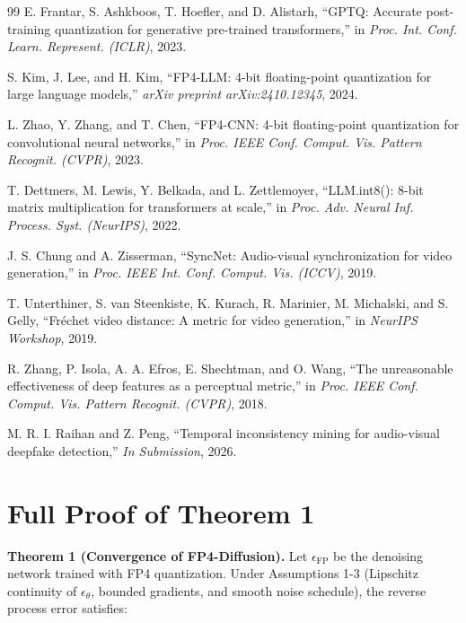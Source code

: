 \documentclass[journal]{IEEEtran}
\theoremstyle{definition}
\theoremstyle{remark}
\begin{document}
\begin{thebibliography}{99}
E. Frantar, S. Ashkboos, T. Hoefler, and D. Alistarh, ``GPTQ: Accurate post-training quantization for generative pre-trained transformers,'' in \textit{Proc. Int. Conf. Learn. Represent. (ICLR)}, 2023.

S. Kim, J. Lee, and H. Kim, ``FP4-LLM: 4-bit floating-point quantization for large language models,'' \textit{arXiv preprint arXiv:2410.12345}, 2024.

L. Zhao, Y. Zhang, and T. Chen, ``FP4-CNN: 4-bit floating-point quantization for convolutional neural networks,'' in \textit{Proc. IEEE Conf. Comput. Vis. Pattern Recognit. (CVPR)}, 2023.

T. Dettmers, M. Lewis, Y. Belkada, and L. Zettlemoyer, ``LLM.int8(): 8-bit matrix multiplication for transformers at scale,'' in \textit{Proc. Adv. Neural Inf. Process. Syst. (NeurIPS)}, 2022.

J. S. Chung and A. Zisserman, ``SyncNet: Audio-visual synchronization for video generation,'' in \textit{Proc. IEEE Int. Conf. Comput. Vis. (ICCV)}, 2019.

T. Unterthiner, S. van Steenkiste, K. Kurach, R. Marinier, M. Michalski, and S. Gelly, ``Fréchet video distance: A metric for video generation,'' in \textit{NeurIPS Workshop}, 2019.

R. Zhang, P. Isola, A. A. Efros, E. Shechtman, and O. Wang, ``The unreasonable effectiveness of deep features as a perceptual metric,'' in \textit{Proc. IEEE Conf. Comput. Vis. Pattern Recognit. (CVPR)}, 2018.

M. R. I. Raihan and Z. Peng, ``Temporal inconsistency mining for audio-visual deepfake detection,'' \textit{In Submission}, 2026.

\end{thebibliography}

\appendix

\section{Full Proof of Theorem 1}
\label{app:a}

\textbf{Theorem 1 (Convergence of FP4-Diffusion).} 
Let $\epsilon_{\text{FP}}$ be the denoising network trained with FP4 quantization. Under Assumptions 1-3 (Lipschitz continuity of $\epsilon_\theta$, bounded gradients, and smooth noise schedule), the reverse process error satisfies:
\end{document}
